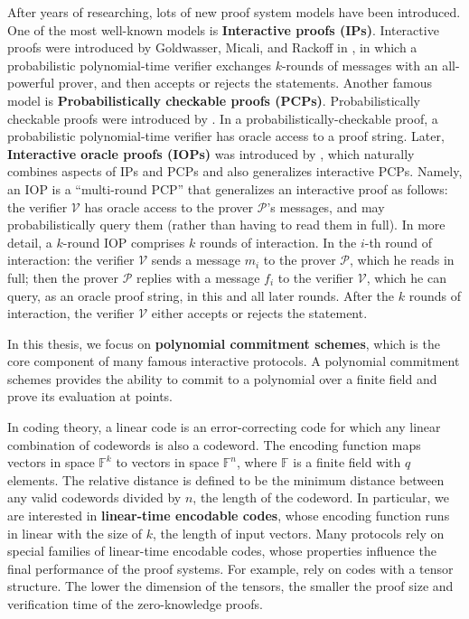 After years of researching, lots of new proof system models have been introduced. 
One of the most well-known models is \textbf{Interactive proofs (IPs)}. Interactive proofs were introduced by Goldwasser, Micali, and Rackoff in \cite{DBLP:books/acm/19/GoldwasserMR19}, in which a probabilistic polynomial-time verifier exchanges $k$-rounds of messages with an all-powerful prover, and then accepts or rejects the statements.  
Another famous model is \textbf{Probabilistically checkable proofs (PCPs)}. Probabilistically checkable proofs were introduced by \cite{DBLP:journals/tcs/FortnowRS94} \cite{DBLP:conf/stoc/BabaiFLS91}. In a probabilistically-checkable proof, a probabilistic polynomial-time verifier has oracle access to a proof string.
Later, \textbf{Interactive oracle proofs (IOPs)} was introduced by \cite{DBLP:conf/tcc/Ben-SassonCS16}, which naturally combines aspects of IPs and PCPs and also generalizes interactive PCPs. Namely, an IOP is a ``multi-round PCP'' that generalizes an interactive proof as follows:
the verifier $\mathcal{V}$ has oracle access to the prover $\mathcal{P}$’s messages, and may probabilistically query them (rather than having to read them in full). In more detail, a $k$-round IOP comprises $k$ rounds of interaction. In the $i$-th round of interaction: the verifier $\mathcal{V}$ sends a message $m_i$ to the prover $\mathcal{P}$, which he reads in full; then the prover $\mathcal{P}$ replies with a message $f_i$ to the verifier $\mathcal{V}$, which he can query, as an oracle proof string, in this and all later rounds. After the $k$ rounds of interaction, the verifier $\mathcal{V}$ either accepts or rejects the statement.


In this thesis, we focus on \textbf{polynomial commitment schemes}, which is the core component of many famous interactive protocols. A polynomial commitment schemes provides the ability to commit to a polynomial over a finite field and prove its evaluation at points.

In coding theory, a linear code is an error-correcting code for which any linear combination of codewords is also a codeword. The encoding function maps vectors in space $\mathbb{F}^k$ to vectors in space $\mathbb{F}^n$, where $\mathbb{F}$ is a finite field with $q$ elements. The relative distance is defined to be the minimum distance between any valid codewords divided by $n$, the length of the codeword. 
In particular, we are interested in \textbf{linear-time encodable codes}, whose encoding function runs in linear with the size of $k$, the length of input vectors.
Many protocols rely on special families of linear-time encodable codes, whose properties influence the final performance of the proof systems. For example, \cite{brakedown} \cite{cryptoeprint:2020/1426} \cite{BCL22} rely on codes with a tensor structure. The lower the dimension of the tensors, the smaller the proof size and verification time of the zero-knowledge proofs.

